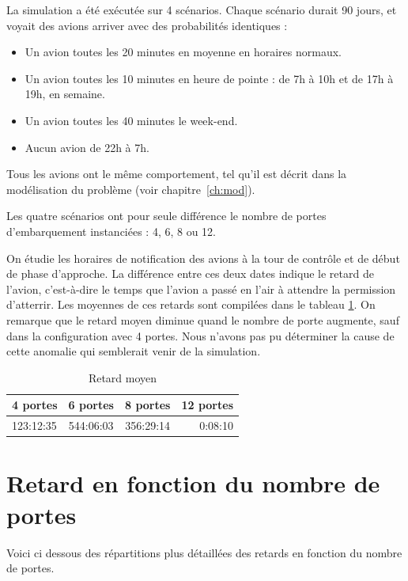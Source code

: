 
La simulation a été exécutée sur 4 scénarios. Chaque scénario durait 90 jours, et voyait des avions arriver avec des probabilités identiques :
\begin{itemize}
  \item Un avion toutes les 20 minutes en moyenne en horaires normaux.
  \item Un avion toutes les 10 minutes en heure de pointe : de 7h à 10h et de 17h à 19h, en semaine.
  \item Un avion toutes les 40 minutes le week-end.
  \item Aucun avion de 22h à 7h.
\end{itemize}
Tous les avions ont le même comportement, tel qu'il est décrit dans la modélisation du problème (voir chapitre~\ref{ch:mod}).

Les quatre scénarios ont pour seule différence le nombre de portes d'embarquement instanciées : 4, 6, 8 ou 12.

On étudie les horaires de notification des avions à la tour de contrôle et de début de phase d'approche. La différence entre ces deux dates indique le retard de l'avion, c'est-à-dire le temps que l'avion a passé en l'air à attendre la permission d'atterrir. Les moyennes de ces retards sont compilées dans le tableau \ref{retard_moyen}. On remarque que le retard moyen diminue quand le nombre de porte augmente, sauf dans la configuration avec 4 portes. Nous n'avons pas pu déterminer la cause de cette anomalie qui semblerait venir de la simulation.

\begin{table}[H]
\begin{center}
\begin{tabular}{|l|c|c|r|}
  \hline
  4 portes & 6 portes & 8 portes & 12 portes \\
  \hline
  123:12:35 & 544:06:03 & 356:29:14 & 0:08:10\\
  \hline
\end{tabular}
   \caption{\label{retard_moyen} Retard moyen}
\end{center}
\end{table}

\section{Retard en fonction du nombre de portes}
Voici ci dessous des répartitions plus détaillées des retards en fonction du nombre de portes.

